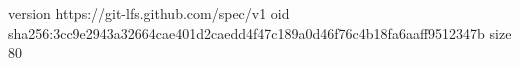 version https://git-lfs.github.com/spec/v1
oid sha256:3cc9e2943a32664cae401d2caedd4f47c189a0d46f76c4b18fa6aaff9512347b
size 80
